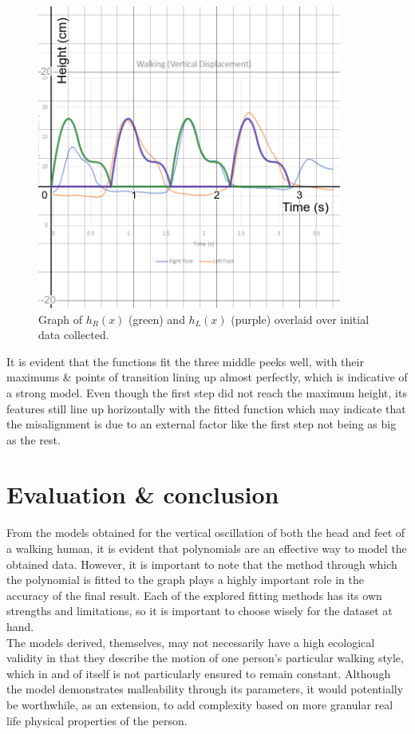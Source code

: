 \documentclass[12pt, a4paper]{article}
\begin{document}
\begin{figure}[H]
    \centering
    \includegraphics[width=10cm]{final_graph_feet.png}
    \caption{ Graph of $h_{R}(x)$ (green) and $h_{L}(x)$ (purple) overlaid over
    initial data collected.}
    \label{final_graph_feet}
\end{figure}

It is evident that the functions fit the three middle peeks well, with their
maximums \& points of transition lining up almost perfectly, which is indicative
of a strong model. Even though the first step did not reach the maximum height,
its features still line up horizontally with the fitted function which may
indicate that the misalignment is due to an external factor like the first step
not being as big as the rest.

\section{Evaluation \& conclusion}
From the models obtained for the vertical oscillation of both the head and feet
of a walking human, it is evident that polynomials are an effective way to model
the obtained data. However, it is important to note that the method through
which the polynomial is fitted to the graph plays a highly important role in the
accuracy of the final result. Each of the explored fitting methods has its own
strengths and limitations, so it is important to choose wisely for the dataset
at hand. \\

The models derived, themselves, may not necessarily have a high ecological
validity in that they describe the motion of one person's particular walking
style, which in and of itself is not particularly ensured to remain constant.
Although the model demonstrates malleability through its parameters, it would
potentially be worthwhile, as an extension, to add complexity based on more
granular real life physical properties of the person. \\
\end{document}
